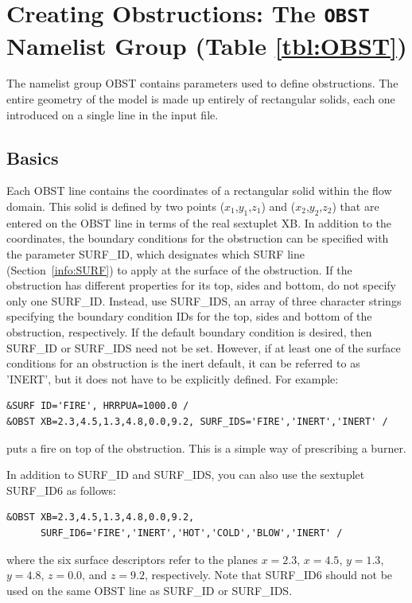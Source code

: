 \documentclass[11pt]{book}
\begin{document}
\section{Creating Obstructions: The \texorpdfstring{{\tt OBST}}{OBST} Namelist Group (Table \ref{tbl:OBST})}
\label{info:OBST}

The namelist group {\ct OBST} contains parameters used to define obstructions. The entire geometry of the model is made up entirely of rectangular solids, each one introduced on a single line in the input file.

\subsection{Basics}
\label{info:OBST_Basics}

Each {\ct OBST} line contains the coordinates of a rectangular
solid within the flow domain. This solid is defined by two points
($x_1$,$y_1$,$z_1$) and ($x_2$,$y_2$,$z_2$) that are entered on the
{\ct OBST} line in terms of the real sextuplet {\ct XB}.
In addition to the coordinates, the boundary conditions for the obstruction
can be specified with the parameter {\ct SURF\_ID}, which designates which
{\ct SURF} line (Section~\ref{info:SURF}) to apply at the surface of the obstruction.
If the obstruction has different properties for its top,
sides and bottom, do not specify only one {\ct SURF\_ID}. Instead, use {\ct SURF\_IDS}, an array of three character
strings specifying the boundary condition {\ct ID}s for the top,
sides and bottom of the obstruction, respectively.
If the default
boundary condition is desired, then {\ct SURF\_ID} or {\ct SURF\_IDS} need not be set.
However, if at least one of the surface conditions for an
obstruction is the inert default, it can be referred to as {\ct 'INERT'}, but it does not have to be explicitly defined.
For example:
\begin{lstlisting}
&SURF ID='FIRE', HRRPUA=1000.0 /
&OBST XB=2.3,4.5,1.3,4.8,0.0,9.2, SURF_IDS='FIRE','INERT','INERT' /
\end{lstlisting}
puts a fire on top of the obstruction. This is a simple way of
prescribing a burner.

In addition to {\ct SURF\_ID} and {\ct SURF\_IDS}, you can also use the sextuplet {\ct SURF\_ID6} as follows:
\begin{lstlisting}
&OBST XB=2.3,4.5,1.3,4.8,0.0,9.2,
      SURF_ID6='FIRE','INERT','HOT','COLD','BLOW','INERT' /
\end{lstlisting}
where the six surface descriptors refer to the planes $x=2.3$, $x=4.5$, $y=1.3$, $y=4.8$, $z=0.0$, and $z=9.2$, respectively. Note that {\ct SURF\_ID6} should not be used on the same {\ct OBST} line as {\ct SURF\_ID} or {\ct SURF\_IDS}.
\end{document}
